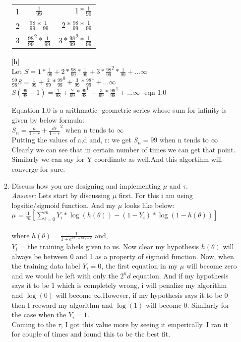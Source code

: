 \documentclass{article}
\begin{document}
\begin{enumerate}
\begin{enumerate}
\begin{table}[h]
\begin{tabular}{cc r}
					\hline
					1 & $\frac{1}{99}$ & $1*\frac{1}{99}$ \\
					2 & $\frac{98}{99} *\frac{1}{99}$ & $2 *\frac{98}{99} *\frac{1}{99}$ \\
					3 & $\frac{98}{99}^2 *\frac{1}{99}$ & $3 *\frac{98}{99}^2 *\frac{1}{99}$ \\
					\hline	
				\end{tabular}
			\end{table}[h] \\			
 Let $S = 1*\frac{1}{99} + 2 *\frac{98}{99} *\frac{1}{99} + 3 *\frac{98}{99}^2 *\frac{1}{99}+ ...\infty$ 	\\
       $\frac{99}{98}S = \frac{1}{99} + \frac{2}{99} *\frac{99}{98}^0 + \frac{3}{99} *\frac{98}{99}^1 + ...\infty$ \\
$S(\frac{99}{98} -1) =\frac{1}{98} + \frac{2}{99}*\frac{99}{98}^0 + \frac{3}{99}*\frac{99}{98}^1 + ...\infty$ -eqn 1.0

Equation 1.0 is a arithmatic -geometric series whose sum for infinity is given by below formula:\\
$S_n = \frac{a}{1-r} + \frac{dr}{1-r}^2$ when n tends to $\infty$ \\
Putting the values of a,d and, r: we get
$S_n = 99$ when n tends to $\infty$ \\
Clearly we can see that in certain number of times we can get that point. Similarly we can say for Y coordinate as well.And this algortihm will converge for sure.
			\item Discuss how you are designing and implementing $\mu$ and $\tau$. \\
			\emph{Answer:} Lets start by discussing $\mu$ first. For this i am using logsitic/sigmoid function. And my $\mu$ looks like below: \\ $\mu$ = $\frac{1}{m}[\sum_{i=0}^{m} Y_{i} * \log(h(\theta))- (1 -Y_{i}) * \log(1- h(\theta))]$ \\\\
where $h(\theta) = \frac{1}{1+ e^{ax_1 + bx_2 + c}}$ and,\\ {$Y_i$ = the training labels given to us.} Now clear my hypothesis $h(\theta)$ will always be between 0 and 1 as a property of sigmoid function. Now, when the training data label $Y_{i}=0$, the first equation in my $\mu$ will become zero and we would be left with only the $2^nd$ equation. And if my hypothesis says it to be 1 which is completely wrong, i will penalize my algorithm and $\log(0)$ will become $\infty$.However, if my hypothesis says it to be 0 then I reeward my algorithm and $\log(1)$ will become 0. Similarly for the case when the $Y_{i}=1$.\\
Coming to the $\tau$, I got this value more by seeing it emperically. I ran it for couple of times and found this to be the best fit.


\end{enumerate}
\end{enumerate}
\end{document}
